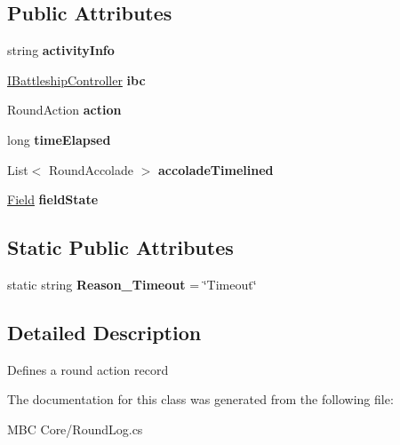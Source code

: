 \subsection*{Public Attributes}
\begin{DoxyCompactItemize}
\item 
\hypertarget{class_m_b_c_1_1_core_1_1_round_log_1_1_round_activity_a93245160332d9eba203f366e9f6c7b40}{string {\bfseries activity\-Info}}\label{class_m_b_c_1_1_core_1_1_round_log_1_1_round_activity_a93245160332d9eba203f366e9f6c7b40}

\item 
\hypertarget{class_m_b_c_1_1_core_1_1_round_log_1_1_round_activity_a792bfde63fceba78ab5551a37618eca1}{\hyperlink{interface_m_b_c_1_1_core_1_1_i_battleship_controller}{I\-Battleship\-Controller} {\bfseries ibc}}\label{class_m_b_c_1_1_core_1_1_round_log_1_1_round_activity_a792bfde63fceba78ab5551a37618eca1}

\item 
\hypertarget{class_m_b_c_1_1_core_1_1_round_log_1_1_round_activity_af5aa39bdbfc08d5d91d1e78778169390}{Round\-Action {\bfseries action}}\label{class_m_b_c_1_1_core_1_1_round_log_1_1_round_activity_af5aa39bdbfc08d5d91d1e78778169390}

\item 
\hypertarget{class_m_b_c_1_1_core_1_1_round_log_1_1_round_activity_a41e76ac7f84c694a03a2d6deae2dd2e5}{long {\bfseries time\-Elapsed}}\label{class_m_b_c_1_1_core_1_1_round_log_1_1_round_activity_a41e76ac7f84c694a03a2d6deae2dd2e5}

\item 
\hypertarget{class_m_b_c_1_1_core_1_1_round_log_1_1_round_activity_ac8200bb672e193945d5cac7ad3bcfd5c}{List$<$ Round\-Accolade $>$ {\bfseries accolade\-Timelined}}\label{class_m_b_c_1_1_core_1_1_round_log_1_1_round_activity_ac8200bb672e193945d5cac7ad3bcfd5c}

\item 
\hypertarget{class_m_b_c_1_1_core_1_1_round_log_1_1_round_activity_a007bff7b101c4416edae38eaa7590c71}{\hyperlink{class_m_b_c_1_1_core_1_1_field}{Field} {\bfseries field\-State}}\label{class_m_b_c_1_1_core_1_1_round_log_1_1_round_activity_a007bff7b101c4416edae38eaa7590c71}

\end{DoxyCompactItemize}
\subsection*{Static Public Attributes}
\begin{DoxyCompactItemize}
\item 
\hypertarget{class_m_b_c_1_1_core_1_1_round_log_1_1_round_activity_af8458e6721eb85d6155a1fc5d81beb6d}{static string {\bfseries Reason\-\_\-\-Timeout} = \char`\"{}Timeout\char`\"{}}\label{class_m_b_c_1_1_core_1_1_round_log_1_1_round_activity_af8458e6721eb85d6155a1fc5d81beb6d}

\end{DoxyCompactItemize}


\subsection{Detailed Description}
Defines a round action record

The documentation for this class was generated from the following file\-:\begin{DoxyCompactItemize}
\item 
M\-B\-C Core/Round\-Log.\-cs\end{DoxyCompactItemize}
